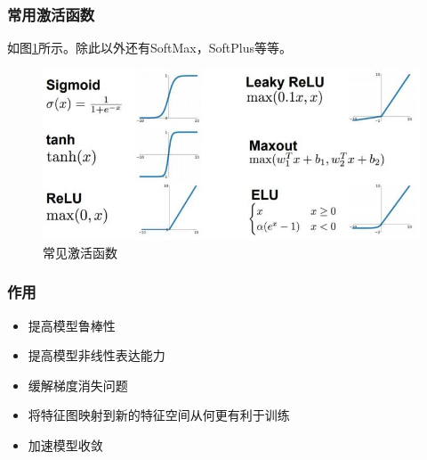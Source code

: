\documentclass[UTF8]{ctexart}
\begin{document}
\subsubsection{常用激活函数}
如图\ref{activationfunction1}所示。除此以外还有SoftMax，SoftPlus等等。
\begin{figure}[htb]
	\centering
	\includegraphics[width=1.0\textwidth]{figures/activationfunction1.jpg}
	\caption{常见激活函数}
	\label{activationfunction1}
\end{figure}
\subsubsection{作用}
\begin{itemize}
	\item 提高模型鲁棒性
	\item 提高模型非线性表达能力
	\item 缓解梯度消失问题
	\item 将特征图映射到新的特征空间从何更有利于训练
	\item 加速模型收敛
\end{itemize}
\end{document}
